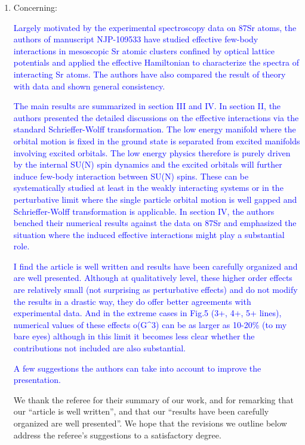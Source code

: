 \documentclass[preprint,showkeys,nofootinbib]{revtex4-1}
\newcommand{\1}{\mathds{1}}
\newcommand{\blue}[1]{\textcolor{blue}{#1}}
\begin{document}
\begin{enumerate}
\item Concerning:

  \blue{Largely motivated by the experimental spectroscopy data on
    87Sr atoms, the authors of manuscript NJP-109533 have studied
    effective few-body interactions in mesoscopic Sr atomic clusters
    confined by optical lattice potentials and applied the effective
    Hamiltonian to characterize the spectra of interacting Sr atoms.
    The authors have also compared the result of theory with data and
    shown general consistency.}

  \blue{The main results are summarized in section III and IV.  In
    section II, the authors presented the detailed discussions on the
    effective interactions via the standard Schrieffer-Wolff
    transformation. The low energy manifold where the orbital motion
    is fixed in the ground state is separated from excited manifolds
    involving excited orbitals. The low energy physics therefore is
    purely driven by the internal SU(N) spin dynamics and the excited
    orbitals will further induce few-body interaction between SU(N)
    spins.  These can be systematically studied at least in the weakly
    interacting systems or in the perturbative limit where the single
    particle orbital motion is well gapped and Schrieffer-Wolff
    transformation is applicable. In section IV, the authors benched
    their numerical results against the data on 87Sr and emphasized
    the situation where the induced effective interactions might play
    a substantial role.}

  \blue{I find the article is well written and results have been
    carefully organized and are well presented.  Although at
    qualitatively level, these higher order effects are relatively
    small (not surprising as perturbative effects) and do not modify
    the results in a drastic way, they do offer better agreements with
    experimental data. And in the extreme cases in Fig.5 (3+, 4+, 5+
    lines), numerical values of these effects o(G\^{}3) can be as
    larger as 10-20\% (to my bare eyes) although in this limit it
    becomes less clear whether the contributions not included are also
    substantial.}

  \blue{A few suggestions the authors can take into account to improve
    the presentation.}

  We thank the referee for their summary of our work, and for
  remarking that our ``article is well written'', and that our
  ``results have been carefully organized are well presented''.  We
  hope that the revisions we outline below address the referee's
  suggestions to a satisfactory degree.



\end{enumerate}
\end{document}
